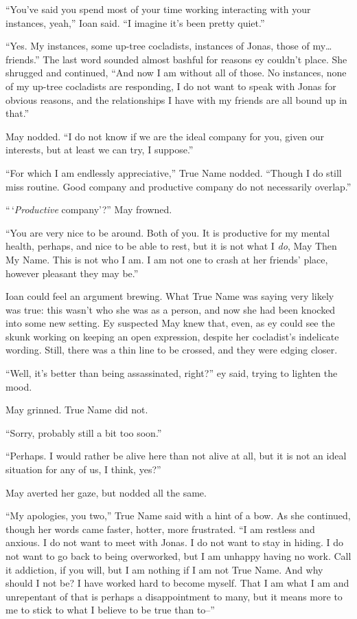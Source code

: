 ``You've said you spend most of your time working interacting with your instances, yeah,'' Ioan said. ``I imagine it's been pretty quiet.''

``Yes. My instances, some up-tree cocladists, instances of Jonas, those of my\ldots friends.'' The last word sounded almost bashful for reasons ey couldn't place. She shrugged and continued, ``And now I am without all of those. No instances, none of my up-tree cocladists are responding, I do not want to speak with Jonas for obvious reasons, and the relationships I have with my friends are all bound up in that.''

May nodded. ``I do not know if we are the ideal company for you, given our interests, but at least we can try, I suppose.''

``For which I am endlessly appreciative,'' True Name nodded. ``Though I do still miss routine. Good company and productive company do not necessarily overlap.''

``\,`\emph{Productive} company'?'' May frowned.

``You are very nice to be around. Both of you. It is productive for my mental health, perhaps, and nice to be able to rest, but it is not what I \emph{do}, May Then My Name. This is not who I am. I am not one to crash at her friends' place, however pleasant they may be.''

Ioan could feel an argument brewing. What True Name was saying very likely was true: this wasn't who she was as a person, and now she had been knocked into some new setting. Ey suspected May knew that, even, as ey could see the skunk working on keeping an open expression, despite her cocladist's indelicate wording. Still, there was a thin line to be crossed, and they were edging closer.

``Well, it's better than being assassinated, right?'' ey said, trying to lighten the mood.

May grinned. True Name did not.

``Sorry, probably still a bit too soon.''

``Perhaps. I would rather be alive here than not alive at all, but it is not an ideal situation for any of us, I think, yes?''

May averted her gaze, but nodded all the same.

``My apologies, you two,'' True Name said with a hint of a bow. As she continued, though her words came faster, hotter, more frustrated. ``I am restless and anxious. I do not want to meet with Jonas. I do not want to stay in hiding. I do not want to go back to being overworked, but I am unhappy having no work. Call it addiction, if you will, but I am nothing if I am not True Name. And why should I not be? I have worked hard to become myself. That I am what I am and unrepentant of that is perhaps a disappointment to many, but it means more to me to stick to what I believe to be true than to--''

